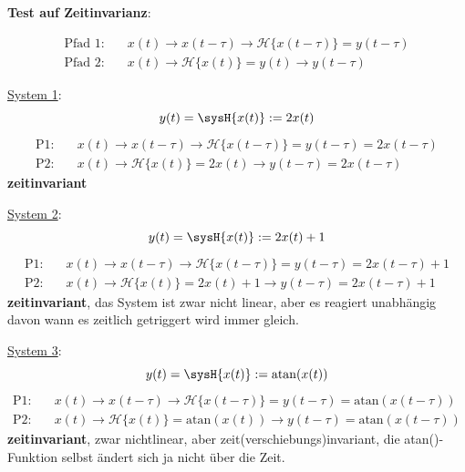 \begin{Loesung}
\textbf{Test auf Zeitinvarianz}:

\begin{align}
\text{Pfad 1:} \quad &x(t)\rightarrow x(t-\tau)\rightarrow \mathcal{H}\{x(t-\tau)\}=y(t-\tau)\\
\text{Pfad 2:} \quad &x(t)\rightarrow \mathcal{H}\{x(t)\}=y(t)\rightarrow y(t-\tau)
\end{align}

\item  \underline{System 1}:
\begin{equation}
y(t) = \sysH{x(t)}:=2 x(t)
\end{equation}
\begin{align}
\text{P1:}& \quad x(t)\rightarrow x(t-\tau)\rightarrow \mathcal{H}\{x(t-\tau)\}=y(t-\tau)=2 x(t-\tau)\\
\text{P2:}& \quad x(t)\rightarrow \mathcal{H}\{x(t)\}=2 x(t)\rightarrow y(t-\tau)=2 x(t-\tau)
\end{align}
\textbf{zeitinvariant}


\item  \underline{System 2}:
\begin{equation}
y(t) = \sysH{x(t)}:= 2 x(t) + 1
\end{equation}
\begin{align}
\text{P1:}& \quad x(t)\rightarrow x(t-\tau)\rightarrow \mathcal{H}\{x(t-\tau)\}=y(t-\tau)=2 x(t-\tau) + 1\\
\text{P2:}& \quad x(t)\rightarrow \mathcal{H}\{x(t)\}=2 x(t)+1\rightarrow y(t-\tau)=2 x(t-\tau) +1
\end{align}
\textbf{zeitinvariant}, das System ist zwar nicht linear, aber es reagiert
unabhängig davon wann es zeitlich getriggert wird immer gleich.


\item  \underline{System 3}:
\begin{equation}
y(t) = \sysH{x(t)}:= \mathrm{atan}(x(t))
\end{equation}
\begin{align}
\text{P1:}& \quad x(t)\rightarrow x(t-\tau)\rightarrow \mathcal{H}\{x(t-\tau)\}=y(t-\tau)=\mathrm{atan}(x(t-\tau))\\
\text{P2:}& \quad x(t)\rightarrow \mathcal{H}\{x(t)\}=\mathrm{atan}(x(t))\rightarrow y(t-\tau)=\mathrm{atan}(x(t-\tau))
\end{align}
\textbf{zeitinvariant}, zwar nichtlinear, aber zeit(verschiebungs)invariant, die
atan()-Funktion selbst ändert sich ja nicht über die Zeit.


\end{Loesung}
